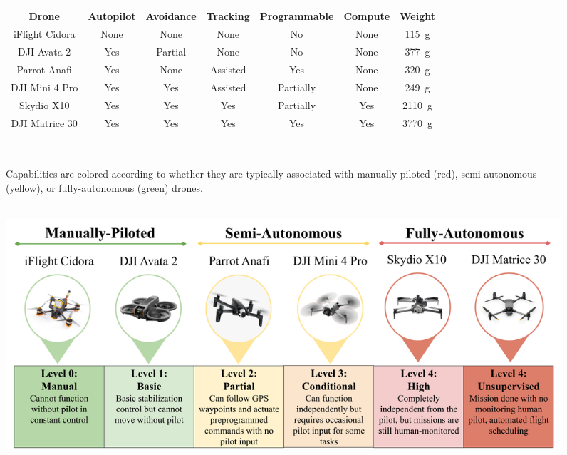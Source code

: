 \begin{figure}[]
    \centering
    \begin{tabular}{|c|c|c|c|c|c|c|}
        \hline
           \rowcolor{lightgray!50}
         \textbf{Drone} & \textbf{Autopilot} & \textbf{Avoidance} & \textbf{Tracking} & \textbf{Programmable} & \textbf{Compute} & \textbf{Weight} \\
         \hline
         iFlight Cidora & \cellcolor{red!20}None & \cellcolor{red!20}None & \cellcolor{red!20}None & \cellcolor{red!20}No & \cellcolor{red!20}None & 115~g \\[0.1cm]
         \hline
         DJI Avata 2 & \cellcolor{green!20}Yes & \cellcolor{yellow!20}Partial & \cellcolor{red!20}None & \cellcolor{red!20}No & \cellcolor{red!20}None & 377~g \\[0.1cm]
         \hline
         Parrot Anafi & \cellcolor{green!20}Yes & \cellcolor{red!20}None & \cellcolor{yellow!20}Assisted & \cellcolor{green!20}Yes & \cellcolor{red!20}None & 320~g \\[0.1cm]
         \hline
         DJI Mini 4 Pro & \cellcolor{green!20}Yes & \cellcolor{green!20}Yes & \cellcolor{yellow!20}Assisted & \cellcolor{yellow!20}Partially & \cellcolor{red!20}None & 249~g \\[0.1cm]
         \hline
         Skydio X10 & \cellcolor{green!20}Yes & \cellcolor{green!20}Yes & \cellcolor{green!20}Yes & \cellcolor{yellow!20}Partially & \cellcolor{green!20}Yes & 2110~g \\[0.1cm]
         \hline
         DJI Matrice 30 & \cellcolor{green!20}Yes & \cellcolor{green!20}Yes & \cellcolor{green!20}Yes & \cellcolor{green!20}Yes & \cellcolor{green!20}Yes & 3770~g \\[0.1cm]
         \hline
    \end{tabular}
    \\[0.2cm]
    \begin{captext}
        \small Capabilities are colored according to whether they are typically associated with manually-piloted (red), semi-autonomous (yellow), or fully-autonomous (green) drones.
    \end{captext}
    \\[0.6cm]
    \centering
    \includegraphics[width=1.0\linewidth]{chapter2/FIGS/spectrum.png}

\end{figure}

